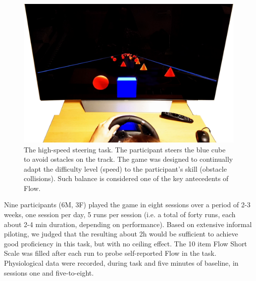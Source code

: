\documentclass[fleqn,10pt]{wlscirep}
\begin{document}
\begin{figure}[!ht]
	\centering
	\includegraphics[width=\linewidth]{Screenshot_cogcarsim}
	\caption{The high-speed steering task. The participant steers the blue cube to avoid ostacles on the track. The game was designed to continually adapt the difficulty level (speed) to the participant's skill (obstacle collisions). Such balance is considered one of the key antecedents of Flow.}
	\label{fig:cogcarsim}
\end{figure}

Nine participants (6M, 3F) played the game in eight sessions over a period of 2-3 weeks, one session per day, 5 runs per session (i.e. a total of forty runs, each about 2-4 min duration, depending on performance). Based on extensive informal piloting, we judged that the resulting about 2h would be sufficient to achieve good proficiency in this task, but with no ceiling effect. The 10 item Flow Short Scale \cite{Engeser2008} was filled after each run to probe self-reported Flow in the task. Physiological data were recorded, during task and five minutes of baseline, in sessions one and five-to-eight.
\end{document}
